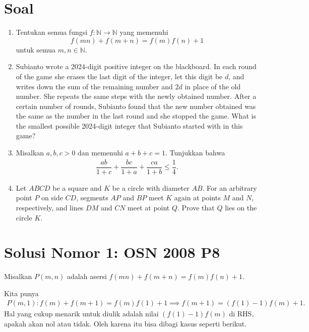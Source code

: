 \documentclass[a4paper, 12pt]{scrartcl}
\begin{document}
\section{Soal}
\begin{enumerate}
    \item Tentukan semua fungsi $f:\mathbb{N}\rightarrow \mathbb{N}$ yang memenuhi
    \[f(mn)+f(m+n)=f(m)f(n)+1\]
    untuk semua $m, n\in \mathbb{N}$.

    \item Subianto wrote a 2024-digit positive integer on the blackboard. In each round of the game she erases the last digit of the integer, let this digit be $d$, and writes down the sum of the remaining number and $2d$ in place of the old number. She repeats the same steps with the newly obtained number. After a certain number of rounds, Subianto found that the new number obtained was the same as the number in the last round and she stopped the game. What is the smallest possible 2024-digit integer that Subianto started with in this game?
    
    \item Misalkan $a,b,c > 0$ dan memenuhi $a+b+c=1$. Tunjukkan bahwa
    \begin{align*}
    \dfrac{ab}{1+c}+\dfrac{bc}{1+a}+\dfrac{ca}{1+b} \le \dfrac{1}{4}.
    \end{align*}

    \item Let $ABCD$ be a square and $K$ be a circle with diameter $AB$. For an arbitrary point $P$ on side $CD$, segments $AP$ and $BP$ meet $K$ again at points $M$ and $N$, respectively, and lines $DM$ and $CN$ meet at point $Q$. Prove that $Q$ lies on the circle $K$.
\end{enumerate}

\newpage

\section{Solusi Nomor 1: OSN 2008 P8}
Misalkan $P(m,n)$ adalah asersi $f(mn)+f(m+n)=f(m)f(n)+1$.

Kita punya
\begin{align*}
    P(m,1): f(m)+f(m+1)=f(m)f(1)+1 \implies f(m+1)=(f(1)-1)f(m)+1.
\end{align*}
Hal yang cukup menarik untuk diulik adalah nilai $(f(1)-1)f(m)$ di RHS, apakah akan nol atau tidak. Oleh karena itu bisa dibagi kasus seperti berikut.\\
\end{document}
